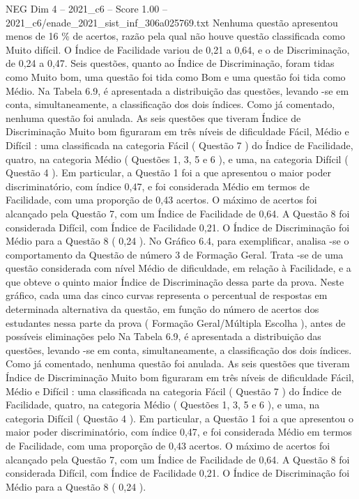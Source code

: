 \begin{textsample}{NEG Dim 4 – 2021\_c6 – Score 1.00 – 2021\_c6/enade\_2021\_sist\_inf\_306a025769.txt}
Nenhuma questão apresentou menos de 16 \% de acertos, razão pela qual não houve questão classificada como Muito difícil.
O Índice de Facilidade variou de 0,21 a 0,64, e o de Discriminação, de 0,24 a 0,47.
Seis questões, quanto ao Índice de Discriminação, foram tidas como Muito bom, uma questão foi tida como Bom e uma questão foi tida como Médio.
Na Tabela 6.9, é apresentada a distribuição das questões, levando -se em conta, simultaneamente, a classificação dos dois índices.
Como já comentado, nenhuma questão foi anulada.
As seis questões que tiveram Índice de Discriminação Muito bom figuraram em três níveis de dificuldade Fácil, Médio e Difícil : uma classificada na categoria Fácil ( Questão 7 ) do Índice de Facilidade, quatro, na categoria Médio ( Questões 1, 3, 5 e 6 ), e uma, na categoria Difícil ( Questão 4 ).
Em particular, a Questão 1 foi a que apresentou o maior poder discriminatório, com índice 0,47, e foi considerada Médio em termos de Facilidade, com uma proporção de 0,43 acertos.
O máximo de acertos foi alcançado pela Questão 7, com um Índice de Facilidade de 0,64.
A Questão 8 foi considerada Difícil, com Índice de Facilidade 0,21.
O Índice de Discriminação foi Médio para a Questão 8 ( 0,24 ).
No Gráfico 6.4, para exemplificar, analisa -se o comportamento da Questão de número 3 de Formação Geral.
Trata -se de uma questão considerada com nível Médio de dificuldade, em relação à Facilidade, e a que obteve o quinto maior Índice de Discriminação dessa parte da prova.
Neste gráfico, cada uma das cinco curvas representa o percentual de respostas em determinada alternativa da questão, em função do número de acertos dos estudantes nessa parte da prova ( Formação Geral/Múltipla Escolha ), antes de possíveis eliminações pelo Na Tabela 6.9, é apresentada a distribuição das questões, levando -se em conta, simultaneamente, a classificação dos dois índices.
Como já comentado, nenhuma questão foi anulada.
As seis questões que tiveram Índice de Discriminação Muito bom figuraram em três níveis de dificuldade Fácil, Médio e Difícil : uma classificada na categoria Fácil ( Questão 7 ) do Índice de Facilidade, quatro, na categoria Médio ( Questões 1, 3, 5 e 6 ), e uma, na categoria Difícil ( Questão 4 ).
Em particular, a Questão 1 foi a que apresentou o maior poder discriminatório, com índice 0,47, e foi considerada Médio em termos de Facilidade, com uma proporção de 0,43 acertos.
O máximo de acertos foi alcançado pela Questão 7, com um Índice de Facilidade de 0,64.
A Questão 8 foi considerada Difícil, com Índice de Facilidade 0,21.
O Índice de Discriminação foi Médio para a Questão 8 ( 0,24 ).

\end{textsample}
